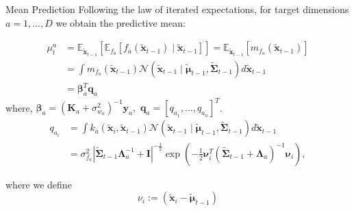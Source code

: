 \begin{frame}{Mean Prediction}
    Following the law of iterated expectations, for target dimensions \( a = 1,..., D \) we obtain the predictive mean:

\begin{equation}\label{eq:mu}
\begin{aligned}
\mu_t^a & =\mathbb{E}_{\tilde{\boldsymbol{x}}_{t-1}}\left[\mathbb{E}_{f_a}\left[f_a\left(\tilde{\boldsymbol{x}}_{t-1}\right) \mid \tilde{\boldsymbol{x}}_{t-1}\right]\right]=\mathbb{E}_{\tilde{\boldsymbol{x}}_{t-1}}\left[m_{f_a}\left(\tilde{\boldsymbol{x}}_{t-1}\right)\right] \\
& =\int m_{f_a}\left(\tilde{\boldsymbol{x}}_{t-1}\right) \mathcal{N}\left(\tilde{\boldsymbol{x}}_{t-1} \mid \tilde{\boldsymbol{\mu}}_{t-1}, \tilde{\boldsymbol{\Sigma}}_{t-1}\right) d \tilde{\boldsymbol{x}}_{t-1} \\
& =\boldsymbol{\beta}_a^T \boldsymbol{q}_a 
\end{aligned}
\end{equation}
where, \quad $\boldsymbol{\beta}_a =\left(\boldsymbol{K}_a+\sigma_{w_a}^2\right)^{-1} \boldsymbol{y}_a ,$ \quad \quad $
  \boldsymbol{q}_a=\left[q_{a_1}, \ldots, q_{a_n}\right]^T$. 
\begin{equation}\label{eq:mu_qa}
\begin{aligned}
q_{a_i} & =\int k_a\left(\tilde{\boldsymbol{x}}_i, \tilde{\boldsymbol{x}}_{t-1}\right) \mathcal{N}\left(\tilde{\boldsymbol{x}}_{t-1} \mid \tilde{\boldsymbol{\mu}}_{t-1}, \tilde{\boldsymbol{\Sigma}}_{t-1}\right) d \tilde{\boldsymbol{x}}_{t-1} \\
& =\sigma_{f_a}^2\left|\tilde{\boldsymbol{\Sigma}}_{t-1} \boldsymbol{\Lambda}_a^{-1}+\boldsymbol{I}\right|^{-\frac{1}{2}} \exp \left(-\frac{1}{2} \boldsymbol{\nu}_i^T\left(\tilde{\boldsymbol{\Sigma}}_{t-1}+\boldsymbol{\Lambda}_a\right)^{-1} \boldsymbol{\nu}_i\right),
\end{aligned}
\end{equation}

where we define
\begin{equation}\label{eq:difference_vi}
    \nu_i:=\left(\tilde{\boldsymbol{x}}_i-\tilde{\boldsymbol{\mu}}_{t-1}\right)
\end{equation}
\end{frame}


